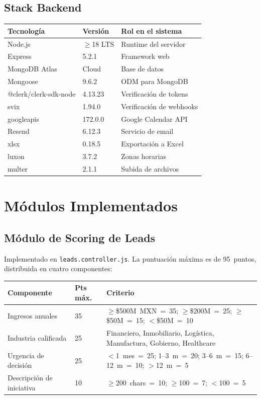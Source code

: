 \documentclass[12pt, a4paper, twoside]{report}
\begin{document}
\subsection*{Stack Backend}
\begin{center}
\begin{tabular}{L{4.5cm} C{2.5cm} L{6cm}}
  \toprule
  \textbf{Tecnología} & \textbf{Versión} & \textbf{Rol en el sistema} \\
  \midrule
  Node.js                & \(\geq\)18 LTS & Runtime del servidor \\
  Express                & 5.2.1    & Framework web \\
  MongoDB Atlas          & Cloud    & Base de datos \\
  Mongoose               & 9.6.2    & ODM para MongoDB \\
  @clerk/clerk-sdk-node  & 4.13.23  & Verificación de tokens \\
  svix                   & 1.94.0   & Verificación de webhooks \\
  googleapis             & 172.0.0  & Google Calendar API \\
  Resend                 & 6.12.3   & Servicio de email \\
  xlsx                   & 0.18.5   & Exportación a Excel \\
  luxon                  & 3.7.2    & Zonas horarias \\
  multer                 & 2.1.1    & Subida de archivos \\
  \bottomrule
\end{tabular}
\end{center}

\section{Módulos Implementados}

\subsection{Módulo de Scoring de Leads}

Implementado en \texttt{leads.controller.js}. La puntuación máxima es de 95~puntos,
distribuida en cuatro componentes:

\begin{center}
\begin{tabular}{L{6cm} C{2cm} L{5.5cm}}
  \toprule
  \textbf{Componente} & \textbf{Pts máx.} & \textbf{Criterio} \\
  \midrule
  Ingresos anuales  & 35 & \(\geq\)\$500M~MXN~=~35; \(\geq\)\$200M~=~25; \(\geq\)\$50M~=~15; \(<\)\$50M~=~10 \\[4pt]
  Industria calificada & 25 & Financiero, Inmobiliario, Logística, Manufactura, Gobierno, Healthcare \\[4pt]
  Urgencia de decisión & 25 & \(<\)1~mes~=~25; 1--3~m~=~20; 3--6~m~=~15; 6--12~m~=~10; \(>\)12~m~=~5 \\[4pt]
  Descripción de iniciativa & 10 & \(\geq\)200~chars~=~10; \(\geq\)100~=~7; \(<\)100~=~5 \\
  \bottomrule
\end{tabular}
\end{center}
\end{document}
